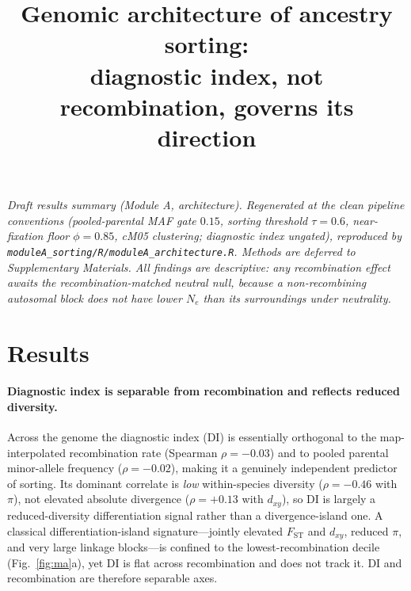 \documentclass[11pt]{article}
\title{\vspace{-3em}Genomic architecture of ancestry sorting:\\
diagnostic index, not recombination, governs its direction}
\author{}
\date{}
\newcommand{\Fst}{\ensuremath{F_{\mathrm{ST}}}}
\newcommand{\dxy}{\ensuremath{d_{xy}}}
\begin{document}
\maketitle
\vspace{-4em}

\noindent\textit{Draft results summary (Module A, architecture). Regenerated at
the clean pipeline conventions (pooled-parental MAF gate $0.15$, sorting
threshold $\tau=0.6$, near-fixation floor $\phi=0.85$, cM05 clustering; diagnostic
index ungated), reproduced by \texttt{moduleA\_sorting/R/moduleA\_architecture.R}. Methods are
deferred to Supplementary Materials. All findings are descriptive: any
recombination effect awaits the recombination-matched neutral null, because a
non-recombining autosomal block does not have lower $N_e$ than its surroundings
under neutrality.}

\section*{Results}

\paragraph{Diagnostic index is separable from recombination and reflects reduced
diversity.}
Across the genome the diagnostic index (DI) is essentially orthogonal to the
map-interpolated recombination rate (Spearman $\rho = -0.03$) and to pooled
parental minor-allele frequency ($\rho = -0.02$), making it a genuinely
independent predictor of sorting. Its dominant correlate is \emph{low}
within-species diversity ($\rho = -0.46$ with $\pi$), not elevated absolute
divergence ($\rho = +0.13$ with \dxy), so DI is largely a reduced-diversity
differentiation signal rather than a divergence-island one. A classical
differentiation-island signature---jointly elevated \Fst{} and \dxy{}, reduced
$\pi$, and very large linkage blocks---is confined to the lowest-recombination
decile (Fig.~\ref{fig:ma}a), yet DI is flat across recombination and does not
track it. DI and recombination are therefore separable axes.
\end{document}
